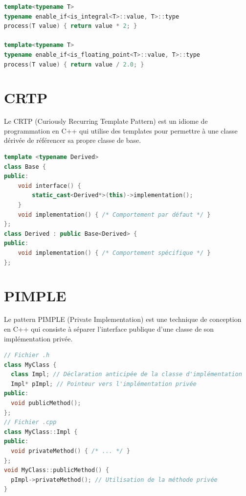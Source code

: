 \documentclass{article}
\begin{document}
\begin{multicols*}{3}
\begin{lstlisting}[language=C++]
template<typename T>
typename enable_if<is_integral<T>::value, T>::type
process(T value) { return value * 2; }

template<typename T>
typename enable_if<is_floating_point<T>::value, T>::type
process(T value) { return value / 2.0; }
\end{lstlisting}

\section*{CRTP}
Le CRTP (Curiously Recurring Template Pattern) est un idiome de programmation en C++ qui utilise des templates pour permettre à une classe dérivée de référencer sa propre classe de base.

\begin{lstlisting}[language=C++]
template <typename Derived>
class Base {
public:
    void interface() {
        static_cast<Derived*>(this)->implementation();
    }
    void implementation() { /* Comportement par défaut */ }
};
class Derived : public Base<Derived> {
public:
    void implementation() { /* Comportement spécifique */ }
};
\end{lstlisting}

\section*{PIMPLE}
Le pattern PIMPLE (Private Implementation) est une technique de conception en C++ qui consiste à séparer l'interface publique d'une classe de son implémentation privée.

\begin{lstlisting}[language=C++]
// Fichier .h
class MyClass {
  class Impl; // Déclaration anticipée de la classe d'implémentation
  Impl* pImpl; // Pointeur vers l'implémentation privée
public:
  void publicMethod();
};
// Fichier .cpp
class MyClass::Impl {
public:
  void privateMethod() { /* ... */ }
};
void MyClass::publicMethod() {
  pImpl->privateMethod(); // Utilisation de la méthode privée
}
\end{lstlisting}


\end{multicols*}
\end{document}
